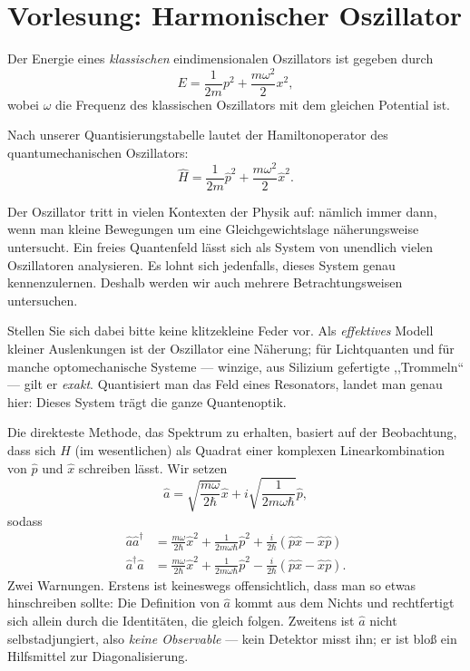 
\section{Vorlesung: Harmonischer Oszillator}
Der Energie eines \emph{klassischen} eindimensionalen Oszillators ist gegeben durch
\begin{equation}
	E = \frac{1}{2m}p^2 + \frac{m\omega^2}{2}x^2,
\end{equation}
wobei $\omega$ die Frequenz des klassischen Oszillators mit dem gleichen Potential
ist.

Nach unserer Quantisierungstabelle lautet der Hamiltonoperator des quantumechanischen Oszillators:
\begin{equation}
	\widehat{H} = \frac{1}{2m}\widehat{p}^2 + \frac{m\omega^2}{2}\widehat{x}^2.
\end{equation}	


Der Oszillator tritt in vielen Kontexten der Physik auf: nämlich immer dann, wenn man kleine Bewegungen um eine Gleichgewichtslage näherungsweise untersucht. Ein freies Quantenfeld lässt sich als System von unendlich
vielen Oszillatoren analysieren. Es lohnt sich jedenfalls, dieses System genau kennenzulernen. Deshalb werden wir auch mehrere Betrachtungsweisen untersuchen.

Stellen Sie sich dabei bitte keine klitzekleine Feder vor. Als \emph{effektives} Modell kleiner Auslenkungen ist der Oszillator eine Näherung; für Lichtquanten und für manche optomechanische Systeme --- winzige, aus Silizium gefertigte ,,Trommeln`` --- gilt er \emph{exakt}. Quantisiert man das Feld eines Resonators, landet man genau hier: Dieses System trägt die ganze Quantenoptik.

Die direkteste Methode, das Spektrum zu erhalten, basiert auf der Beobachtung, dass sich $H$ (im wesentlichen) als Quadrat einer komplexen Linearkombination von $\widehat{p}$ und $\widehat{x}$ schreiben lässt. Wir setzen
\begin{equation}
	\widehat{a} = \sqrt{\frac{m\omega}{2\hbar}}\widehat{x} + i \sqrt{\frac{1}{2m\omega\hbar}}\widehat{p},
\end{equation}
sodass
\begin{align}
	\widehat{a} \widehat{a}^\dag &= \frac{m\omega}{2\hbar}\widehat{x}^2 + \frac{1}{2m\omega\hbar}\widehat{p}^2 + \frac{i}{2\hbar} (\widehat{p}\widehat{x} - \widehat{x}\widehat{p}) \\
	\widehat{a}^\dag \widehat{a} &= \frac{m\omega}{2\hbar}\widehat{x}^2 + \frac{1}{2m\omega\hbar}\widehat{p}^2 - \frac{i}{2\hbar} (\widehat{p}\widehat{x} - \widehat{x}\widehat{p}).
\end{align}
Zwei Warnungen. Erstens ist keineswegs offensichtlich, dass man so etwas hinschreiben sollte: Die Definition von $\widehat{a}$ kommt aus dem Nichts und rechtfertigt sich allein durch die Identitäten, die gleich folgen. Zweitens ist $\widehat{a}$ nicht selbstadjungiert, also \emph{keine Observable} --- kein Detektor misst ihn; er ist bloß ein Hilfsmittel zur Diagonalisierung.

